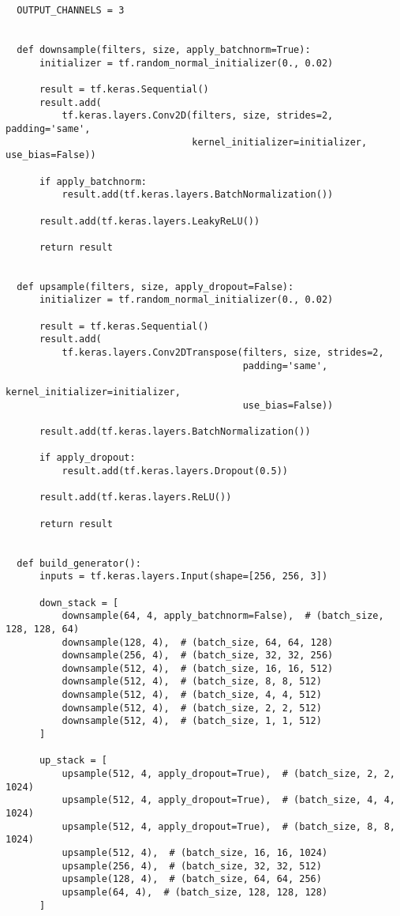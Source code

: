 \begin{lstlisting}
  OUTPUT_CHANNELS = 3


  def downsample(filters, size, apply_batchnorm=True):
      initializer = tf.random_normal_initializer(0., 0.02)

      result = tf.keras.Sequential()
      result.add(
          tf.keras.layers.Conv2D(filters, size, strides=2, padding='same',
                                 kernel_initializer=initializer, use_bias=False))

      if apply_batchnorm:
          result.add(tf.keras.layers.BatchNormalization())

      result.add(tf.keras.layers.LeakyReLU())

      return result


  def upsample(filters, size, apply_dropout=False):
      initializer = tf.random_normal_initializer(0., 0.02)

      result = tf.keras.Sequential()
      result.add(
          tf.keras.layers.Conv2DTranspose(filters, size, strides=2,
                                          padding='same',
                                          kernel_initializer=initializer,
                                          use_bias=False))

      result.add(tf.keras.layers.BatchNormalization())

      if apply_dropout:
          result.add(tf.keras.layers.Dropout(0.5))

      result.add(tf.keras.layers.ReLU())

      return result


  def build_generator():
      inputs = tf.keras.layers.Input(shape=[256, 256, 3])

      down_stack = [
          downsample(64, 4, apply_batchnorm=False),  # (batch_size, 128, 128, 64)
          downsample(128, 4),  # (batch_size, 64, 64, 128)
          downsample(256, 4),  # (batch_size, 32, 32, 256)
          downsample(512, 4),  # (batch_size, 16, 16, 512)
          downsample(512, 4),  # (batch_size, 8, 8, 512)
          downsample(512, 4),  # (batch_size, 4, 4, 512)
          downsample(512, 4),  # (batch_size, 2, 2, 512)
          downsample(512, 4),  # (batch_size, 1, 1, 512)
      ]

      up_stack = [
          upsample(512, 4, apply_dropout=True),  # (batch_size, 2, 2, 1024)
          upsample(512, 4, apply_dropout=True),  # (batch_size, 4, 4, 1024)
          upsample(512, 4, apply_dropout=True),  # (batch_size, 8, 8, 1024)
          upsample(512, 4),  # (batch_size, 16, 16, 1024)
          upsample(256, 4),  # (batch_size, 32, 32, 512)
          upsample(128, 4),  # (batch_size, 64, 64, 256)
          upsample(64, 4),  # (batch_size, 128, 128, 128)
      ]


\end{lstlisting}
